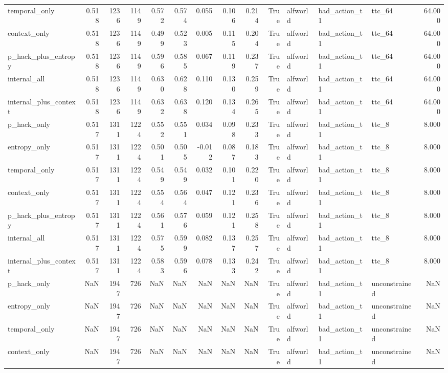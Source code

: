 \begin{tabular}{lrrrrrrrrrlllr}
temporal_only & 0.518 & 1236 & 1149 & 0.572 & 0.574 & 0.055 & 0.106 & 0.214 & True & alfworld & bad_action_t1 & ttc_64 & 64.000 \\
context_only & 0.518 & 1236 & 1149 & 0.499 & 0.523 & 0.005 & 0.115 & 0.204 & True & alfworld & bad_action_t1 & ttc_64 & 64.000 \\
p_hack_plus_entropy & 0.518 & 1236 & 1149 & 0.596 & 0.585 & 0.067 & 0.119 & 0.237 & True & alfworld & bad_action_t1 & ttc_64 & 64.000 \\
internal_all & 0.518 & 1236 & 1149 & 0.630 & 0.628 & 0.110 & 0.130 & 0.259 & True & alfworld & bad_action_t1 & ttc_64 & 64.000 \\
internal_plus_context & 0.518 & 1236 & 1149 & 0.632 & 0.638 & 0.120 & 0.134 & 0.265 & True & alfworld & bad_action_t1 & ttc_64 & 64.000 \\
p_hack_only & 0.517 & 1311 & 1224 & 0.552 & 0.551 & 0.034 & 0.098 & 0.233 & True & alfworld & bad_action_t1 & ttc_8 & 8.000 \\
entropy_only & 0.517 & 1311 & 1224 & 0.501 & 0.505 & -0.012 & 0.087 & 0.183 & True & alfworld & bad_action_t1 & ttc_8 & 8.000 \\
temporal_only & 0.517 & 1311 & 1224 & 0.549 & 0.549 & 0.032 & 0.101 & 0.220 & True & alfworld & bad_action_t1 & ttc_8 & 8.000 \\
context_only & 0.517 & 1311 & 1224 & 0.554 & 0.564 & 0.047 & 0.121 & 0.236 & True & alfworld & bad_action_t1 & ttc_8 & 8.000 \\
p_hack_plus_entropy & 0.517 & 1311 & 1224 & 0.561 & 0.576 & 0.059 & 0.121 & 0.258 & True & alfworld & bad_action_t1 & ttc_8 & 8.000 \\
internal_all & 0.517 & 1311 & 1224 & 0.575 & 0.599 & 0.082 & 0.137 & 0.257 & True & alfworld & bad_action_t1 & ttc_8 & 8.000 \\
internal_plus_context & 0.517 & 1311 & 1224 & 0.583 & 0.596 & 0.078 & 0.133 & 0.242 & True & alfworld & bad_action_t1 & ttc_8 & 8.000 \\
p_hack_only & NaN & 1947 & 726 & NaN & NaN & NaN & NaN & NaN & True & alfworld & bad_action_t1 & unconstrained & NaN \\
entropy_only & NaN & 1947 & 726 & NaN & NaN & NaN & NaN & NaN & True & alfworld & bad_action_t1 & unconstrained & NaN \\
temporal_only & NaN & 1947 & 726 & NaN & NaN & NaN & NaN & NaN & True & alfworld & bad_action_t1 & unconstrained & NaN \\
context_only & NaN & 1947 & 726 & NaN & NaN & NaN & NaN & NaN & True & alfworld & bad_action_t1 & unconstrained & NaN \\

\end{tabular}
